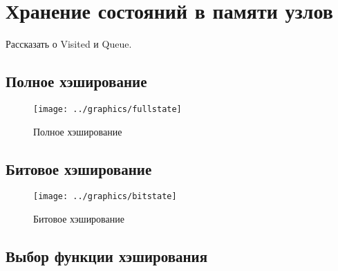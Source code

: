 \chapter{Хранение состояний в памяти узлов}
\label{cha:par-state-store}

Рассказать о Visited и Queue.

\section{Полное хэширование}
\label{sec:fullhash-store}

\begin{figure}[ht]
  \centering
  \texttt{[image: ../graphics/fullstate]}
  
  \caption{Полное хэширование}
  \label{fig:fullstate}
\end{figure}

\section{Битовое хэширование}
\label{sec:bithash-store}

\begin{figure}[ht]
  \centering
  \texttt{[image: ../graphics/bitstate]}  
  \caption{Битовое хэширование}
  \label{fig:bitstate}
\end{figure}

\section{Выбор функции хэширования}
\label{sec:hashing-function}


